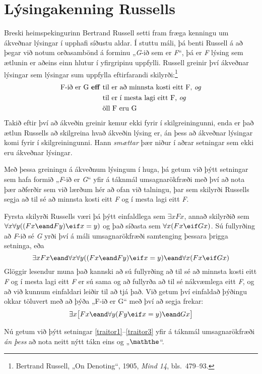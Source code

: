\section{Lýsingakenning Russells}
Breski heimspekingurinn Bertrand Russell setti fram fræga kenningu um ákveðnar lýsingar í upphafi síðustu aldar. Í stuttu máli, þá benti Russell á að þegar við notum orðasambönd á forminu „\emph{G}-ið sem er \emph{F}“, þá er \emph{F} lýsing sem ætlunin er aðeins einn hlutur í yfirgripinu uppfylli. Russell greinir því ákveðnar lýsingar sem lýsingar sum uppfylla eftirfarandi skilyrði:\footnote{Bertrand Russell, „On Denoting“, 1905, \emph{Mind 14}, bls.\ 479--93.}
	\begin{align*}
		\text{F-ið er G \textbf{eff} }&\text{til er að minnsta kosti eitt F, \emph{og}}\\
	&\text{til er í mesta lagi eitt F, \emph{og}}\\	
	&\text{öll F eru G}
\end{align*}
Takið eftir því að ákveðin greinir kemur ekki fyrir í skilgreiningunni, enda er það ætlun Russells að skilgreina hvað ákveðin lýsing er, án þess að ákveðnar lýsingar komi fyrir í skilgreiningunni. Hann \emph{smættar} þær niður í aðrar setningar sem ekki eru ákveðnar lýsingar.

Með þessa greiningu á ákveðnum lýsingum í huga, þá getum við þýtt setningar sem hafa formið „\emph{F}-ið er \emph{G}“ yfir á táknmál umsagnarökfræði með því að nota þær aðferðir sem við lærðum hér að ofan við talningu, þar sem skilyrði Russells segja að til sé að minnsta kosti eitt \emph{F} og í mesta lagi eitt \emph{F}. 

Fyrsta skilyrði Russells væri þá þýtt einfaldlega sem $\exists x Fx$, annað skilyrðið sem $\forall x \forall y ((Fx \eand Fy) \eif x = y)$ og það síðasta sem $\forall x (Fx \eif Gx)$. Sú fullyrðing að \emph{F}-ið sé \emph{G} yrði því á máli umsagnarökfræði samtenging þessara þrigga setninga, eða $$\exists x Fx \eand \forall x \forall y ((Fx \eand Fy) \eif x = y) \eand \forall x (Fx \eif Gx)$$
Glöggir lesendur muna það kannski að sú fullyrðing að til sé að minnsta kosti eitt \emph{F} og í mesta lagi eitt \emph{F} er sú sama og að fullyrða að til sé nákvæmlega eitt \emph{F}, og að við kunnum einfaldari leiðir til að tjá það. Við getum því einfaldað þýðingu okkar töluvert með að þýða „F-ið er G“ með því að segja frekar: $$\exists x \bigl[Fx \eand \forall y (Fy \eif x = y) \eand Gx\bigr]$$

Nú getum við þýtt setningar \ref{traitor1}--\ref{traitor3} yfir á táknmál umsagnarökfræði \emph{án þess} að nota neitt nýtt tákn eins og „$\maththe$“. 

